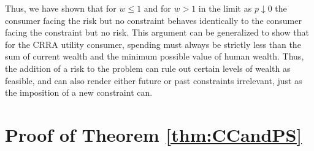 \documentclass[titlepage]{\econtex}
\begin{document}
  Thus, we have shown that for $w \leq 1 $ and for $w > 1$ in the limit as $p \downarrow 0$ the consumer facing the risk but no constraint behaves identically to the consumer facing the constraint but no risk. This argument can be generalized to show that for the CRRA utility consumer, spending must always be strictly less than the sum of current wealth and the minimum possible value of human wealth.  Thus, the addition of a risk to the problem can rule out certain levels of wealth as feasible, and can also render either future or past constraints irrelevant, just as the imposition of a new constraint can. 


  \section{Proof of Theorem \ref{thm:CCandPS}}\label{app:CCandPS}
\end{document}
